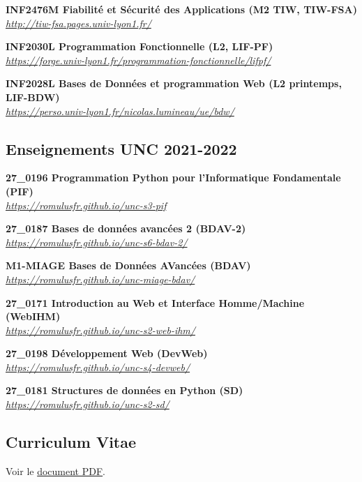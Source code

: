 \documentclass[12pt,a4paper]{article}
\newcommand{\activite}[1]{\textbf{#1}\xspace}
\newcommand{\comment}[1]{\textsl{#1}\xspace}
\begin{document}
\activite{INF2476M Fiabilité et Sécurité des Applications (M2 TIW, TIW-FSA)}\\
\comment{\url{http://tiw-fsa.pages.univ-lyon1.fr/}}

\activite{INF2030L Programmation Fonctionnelle (L2, LIF-PF)}\\
\comment{\url{https://forge.univ-lyon1.fr/programmation-fonctionnelle/lifpf/}}

\activite{INF2028L Bases de Données et programmation Web (L2 printemps, LIF-BDW)}\\
\comment{\url{https://perso.univ-lyon1.fr/nicolas.lumineau/ue/bdw/}}

\subsection*{Enseignements UNC 2021-2022}
\activite{27\_0196 Programmation Python pour l'Informatique Fondamentale (PIF)}\\
\comment{\url{https://romulusfr.github.io/unc-s3-pif}}

\activite{27\_0187 Bases de données avancées 2 (BDAV-2)}\\
\comment{\url{https://romulusfr.github.io/unc-s6-bdav-2/}}

\activite{M1-MIAGE Bases de Données AVancées (BDAV)}\\
\comment{\url{https://romulusfr.github.io/unc-miage-bdav/}}

\activite{27\_0171 Introduction au Web et Interface Homme/Machine (WebIHM)}\\
\comment{\url{https://romulusfr.github.io/unc-s2-web-ihm/}}

\activite{27\_0198 Développement Web (DevWeb)}\\
\comment{\url{https://romulusfr.github.io/unc-s4-devweb/}}

\activite{27\_0181 Structures de données en Python (SD)}\\
\comment{\url{https://romulusfr.github.io/unc-s2-sd/}}


\subsection*{Curriculum Vitae}

Voir le \href{https://perso.liris.cnrs.fr/rthion/files/THION_CV.pdf}{document PDF}.
\end{document}

